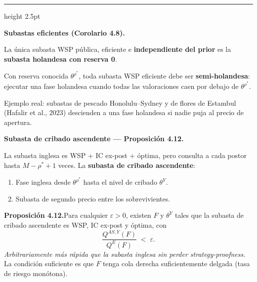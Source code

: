 \documentclass[20pt]{extarticle}
\renewcommand{\normalsize}{\fontsize{24}{30}\selectfont}
\renewcommand{\small}{\fontsize{20}{25}\selectfont}
\renewcommand{\footnotesize}{\fontsize{18}{22}\selectfont}
\newcommand{\grnd}[1]{\textcolor{colgrn}{\textbf{#1}}}
\newcommand{\mut}[1]{\textcolor{muted}{#1}}
\newcommand{\shr}{{\vspace{12mm}\color{rulegray}\hrule height 2.5pt\vspace{12mm}}}
\begin{document}
\begin{minipage}[t]{35cm}
\begin{center}
  \end{center}

  \shr

  {\small\textbf{Subastas eficientes (Corolario 4.8).}}
  \vspace{4mm}
  \begin{tcolorbox}[gbar]
    \footnotesize La única subasta WSP pública, eficiente e \textbf{independiente del prior} es la \grnd{subasta holandesa con reserva 0}.

    \smallskip Con reserva conocida $\theta^{\rho^*}$, toda subasta WSP eficiente debe ser \textbf{semi-holandesa}: ejecutar una fase holandesa cuando todas las valoraciones caen por debajo de $\theta^{\rho^*}$.

    \smallskip\mut{Ejemplo real: subastas de pescado Honolulu--Sydney y de flores de Estambul (Hafalir et al., 2023) descienden a una fase holandesa si nadie puja al precio de apertura.}
  \end{tcolorbox}

  \vspace{8mm}
  {\small\textbf{Subasta de cribado ascendente — Proposición 4.12.}}

  \vspace{4mm}
  {\footnotesize La subasta inglesa es WSP + IC ex-post + óptima, pero consulta a cada postor hasta $M{-}\rho^*{+}1$ veces. La \textbf{subasta de cribado ascendente}:
    \begin{enumerate}
      \item Fase inglesa desde $\theta^{\rho^*}$ hasta el nivel de cribado $\theta^Y$.
      \item Subasta de segundo precio entre los sobrevivientes.
    \end{enumerate}}

  \begin{tcolorbox}[sidebar]
    \footnotesize\textbf{Proposición 4.12.}\enspace Para cualquier $\varepsilon>0$, existen $F$ y $\theta^Y$ tales que la subasta de cribado ascendente es WSP, IC ex-post y óptima, con
    \[
      \frac{Q^{AS,Y}(F)}{Q^E(F)} \;<\; \varepsilon.
    \]
    \emph{Arbitrariamente más rápida que la subasta inglesa sin perder strategy-proofness.} La condición suficiente es que $F$ tenga cola derecha suficientemente delgada (tasa de riesgo monótona).
  \end{tcolorbox}

\end{minipage}
\end{document}
